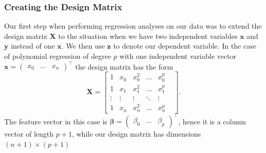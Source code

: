 \documentclass[aps,pra,english,notitlepage,reprint,nofootinbib]{revtex4-1}  %
\begin{document}
\subsubsection{Creating the Design Matrix}
Our first step when performing regression analyses on our data was to extend the design matrix $\mathbf{X}$ to the situation when we have two independent variables $\mathbf{x}$ and $\mathbf{y}$ instead of one $\mathbf{x}$. We then use $\mathbf{z}$ to denote our dependent variable. In the case of polynomial regression of degree $p$ with one independent variable vector $\mathbf{x}=\begin{pmatrix} x_0 &\ldots&x_{n}\end{pmatrix}^\top$ the design matrix has the form
\begin{equation*}
  \mathbf{X} = \begin{bmatrix}
    1 & x_0 & x_0^2 & \ldots & x_0^p
    \\
    1 & x_1 & x_1^2 & \ldots & x_1^p
    \\
    \vdots&\vdots&\vdots&\ddots&\vdots&
    \\
    1 & x_{n} & x_{n}^2 & \ldots&x_{n}^p
  \end{bmatrix}.
\end{equation*}
The feature vector in this case is $\boldsymbol{\beta}=\begin{pmatrix} \beta_0 &\ldots&\beta_{p}\end{pmatrix}^\top$, hence it is a column vector of length $p+1$, while our design matrix has dimensions $(n+1)\times (p+1)$
\end{document}
